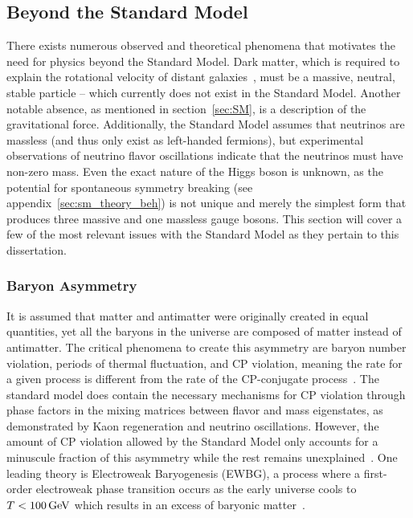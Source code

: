 \subsection{Beyond the Standard Model} \label{sec:theory_motivation}
There exists numerous observed and theoretical phenomena that motivates the need for physics beyond the Standard Model. Dark matter, which is required to explain the rotational velocity of distant galaxies~\cite{zwicky_dm}, must be a massive, neutral, stable particle -- which currently does not exist in the Standard Model. Another notable absence, as mentioned in section~\ref{sec:SM}, is a description of the gravitational force. Additionally, the Standard Model assumes that neutrinos are massless (and thus only exist as left-handed fermions), but experimental observations of neutrino flavor oscillations indicate that the neutrinos must have non-zero mass. Even the exact nature of the Higgs boson is unknown, as the potential for spontaneous symmetry breaking (see appendix~\ref{sec:sm_theory_beh}) is not unique and merely the simplest form that produces three massive and one massless gauge bosons. This section will cover a few of the most relevant issues with the Standard Model as they pertain to this dissertation.

\subsubsection{Baryon Asymmetry} \label{sec:baryon_asymmetry}
It is assumed that matter and antimatter were originally created in equal quantities, yet all the baryons in the universe are composed of matter instead of antimatter. The critical phenomena to create this asymmetry are baryon number violation, periods of thermal fluctuation, and CP violation, meaning the rate for a given process is different from the rate of the CP-conjugate process~\cite{Sakharov:1967dj}. The standard model does contain the necessary mechanisms for CP violation through phase factors in the mixing matrices between flavor and mass eigenstates, as demonstrated by Kaon regeneration and neutrino oscillations. However, the amount of CP violation allowed by the Standard Model only accounts for a minuscule fraction of this asymmetry while the rest remains unexplained~\cite{Peskin2002}. One leading theory is Electroweak Baryogenesis (EWBG), a process where a first-order electroweak phase transition occurs as the early universe cools to $T<100\,\text{Ge\hspace{-.08em}V}$ which results in an excess of baryonic matter~\cite{ewbg1,ewbg2}.

